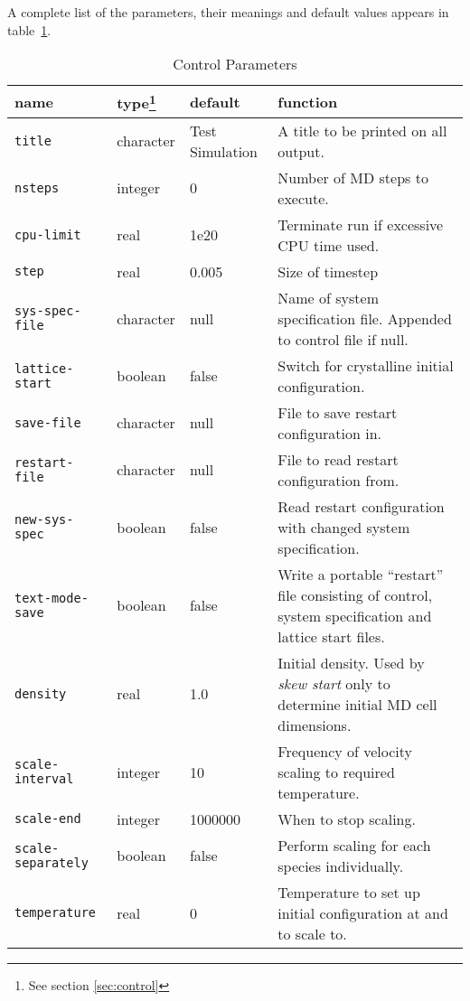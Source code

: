 A complete list of the parameters,
their meanings and default values appears in
table~\ref{tab:parameters}. 

\begin{table}
\begin{minipage}{\textwidth}
\caption{Control Parameters}
\label{tab:parameters}
\begin{tabular}{|l|l|l|p{2.7in}|}
\hline
{\bf name} & {\bf type}\footnote{See section \ref{sec:control}} &
{\bf default} & {\bf function} \\ \hline \hline
\verb'title' &	    		character  & {\small Test Simulation} &
A title to be printed on all output. \\
\verb'nsteps' &	    		integer & 			0 &
Number of MD steps to execute. \\
\verb'cpu-limit' &		real &			1e20 &
Terminate run if excessive CPU time used. \\
\verb'step' &	    		real &			0.005 &
Size of timestep \\ \hline
\verb'sys-spec-file' &   	character  &	null &
Name of system specification file.  Appended to control file if null. \\
\verb'lattice-start' &		boolean & 		false  &
Switch for crystalline initial configuration. \\
\verb'save-file' &	   	character  &	null &
File to save restart configuration in. \\
\verb'restart-file' &    	character  &	null &
File to read restart configuration from. \\
\verb'new-sys-spec' &    	boolean & 		false  &
Read restart configuration with changed system specification. \\
\verb'text-mode-save' &  	boolean & 		false &
Write a portable ``restart'' file consisting of control, system
specification and lattice start files. \\ \hline
\verb'density' &	    	real &			1.0 &
Initial density.  Used by {\em skew start} only to determine initial
MD cell dimensions. \\ \hline
\verb'scale-interval' &    	integer & 		10 &
Frequency of velocity scaling to required temperature. \\
\verb'scale-end' &	   	integer & 			1000000 &
When to stop scaling. \\
\verb'scale-separately' &	boolean & 		false  &
Perform scaling for each species individually. \\
\verb'temperature' &    	real &			0 &
Temperature to set up initial configuration at and to scale to. \\ \hline

\end{tabular}
\end{minipage}
\end{table}
